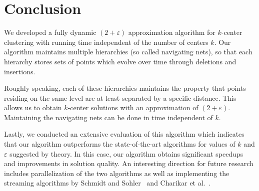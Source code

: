
\section{Conclusion}
We developed a fully dynamic $(2 + \varepsilon)$ approximation algorithm for $k$-center clustering with running time independent of the number of centers $k$. Our algorithm maintains multiple hierarchies (so called navigating nets), so that each hierarchy stores sets of points which evolve over time through deletions and insertions. 

Roughly speaking, each of these hierarchies maintains the property that points residing on the same level are at least separated by a specific distance. This allows us to obtain $k$-center solutions with an approximation of $(2 + \varepsilon)$. Maintaining the navigating nets can be done in time independent of $k$. 

Lastly, we conducted an extensive evaluation of this algorithm which indicates that our algorithm outperforms the state-of-the-art algorithms for values of $k$ and $\varepsilon$ suggested by theory. In this case, our algorithm obtains significant speedups and improvements in solution quality. An interesting direction for future research includes parallelization of the two algorithms as well as implementing the streaming algorithms by Schmidt and Sohler~\cite{schmidt2019dynamic, mccutchen2008streaming} and Charikar et al.~\cite{charikar2004incremental}.
